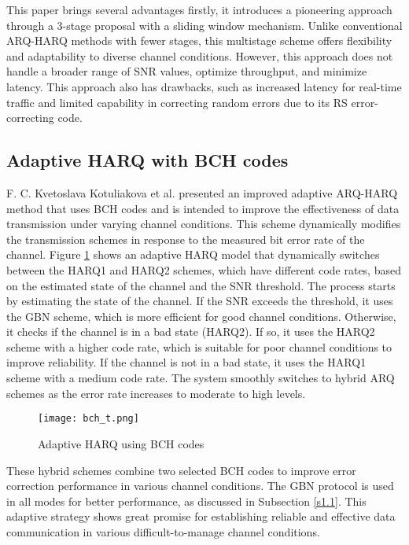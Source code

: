 \documentclass[sn-mathphys-num]{sn-jnl}
\theoremstyle{thmstyleone}
\theoremstyle{thmstyletwo}%
\theoremstyle{thmstylethree}%
\begin{document}
This paper brings several advantages firstly, it introduces a pioneering approach through a 3-stage proposal with a sliding window mechanism. Unlike conventional ARQ-HARQ methods with fewer stages, this multistage scheme offers flexibility and adaptability to diverse channel conditions. However, this approach does not handle a broader range of SNR values, optimize throughput, and minimize latency. This approach also has drawbacks, such as increased latency for real-time traffic and limited capability in correcting random errors due to its RS error-correcting code.

\subsection{Adaptive HARQ with BCH codes } \label{s2.3}

F. C. Kvetoslava Kotuliakova et al. \cite{r5} presented an improved adaptive ARQ-HARQ method \cite{r20} that uses BCH codes and is intended to improve the effectiveness of data transmission under varying channel conditions. This scheme dynamically modifies the transmission schemes in response to the measured bit error rate of the channel. Figure \ref{fig:4} shows an adaptive HARQ model that dynamically switches between the HARQ1 and HARQ2 schemes, which have different code rates, based on the estimated state of the channel and the SNR threshold. The process starts by estimating the state of the channel. If the SNR exceeds the threshold, it uses the GBN scheme, which is more efficient for good channel conditions. Otherwise, it checks if the channel is in a bad state (HARQ2). If so, it uses the HARQ2 scheme with a higher code rate, which is suitable for poor channel conditions to improve reliability. If the channel is not in a bad state, it uses the HARQ1 scheme with a medium code rate. The system smoothly switches to hybrid ARQ schemes as the error rate increases to moderate to high levels. 

\begin{figure}[H]
    \centering
    \texttt{[image: bch\_t.png]}
    \caption{Adaptive HARQ using BCH codes \cite{r5}}
    \label{fig:4}
\end{figure}

These hybrid schemes combine two selected BCH codes to improve error correction performance in various channel conditions. The GBN \cite{r18} protocol is used in all modes for better performance, as discussed in Subsection \ref{s1.1}. This adaptive strategy shows great promise for establishing reliable and effective data communication in various difficult-to-manage channel conditions.
\end{document}
